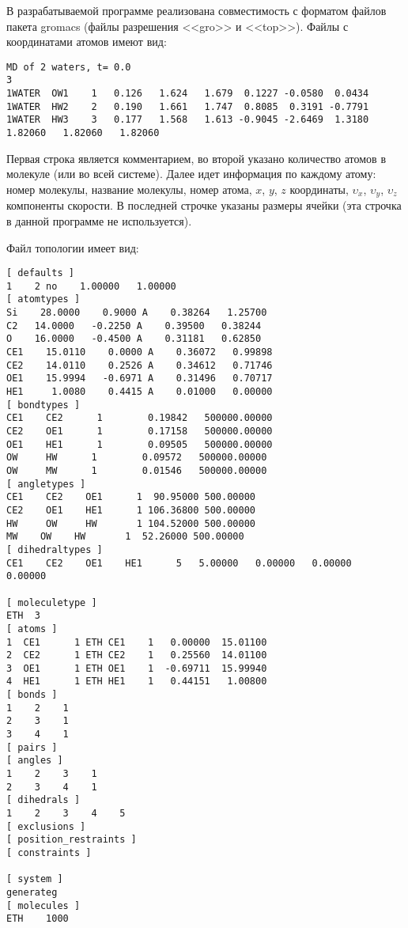 В разрабатываемой программе реализована совместимость с форматом файлов пакета gromacs (файлы разрешения <<gro>> и  <<top>>). Файлы с координатами атомов имеют вид:
\begin{lstlisting}
MD of 2 waters, t= 0.0
3
1WATER  OW1    1   0.126   1.624   1.679  0.1227 -0.0580  0.0434
1WATER  HW2    2   0.190   1.661   1.747  0.8085  0.3191 -0.7791
1WATER  HW3    3   0.177   1.568   1.613 -0.9045 -2.6469  1.3180
1.82060   1.82060   1.82060
\end{lstlisting}

Первая строка является комментарием, во второй указано количество атомов в молекуле (или во всей системе). Далее идет информация по каждому атому: номер молекулы, название молекулы, номер атома, $x$, $y$, $z$ координаты, $\upsilon_x$,  $\upsilon_y$, $\upsilon_z$ компоненты скорости. В последней строчке указаны размеры ячейки (эта строчка в данной программе не используется).

Файл топологии имеет вид:
\begin{lstlisting}
[ defaults ]
1    2 no    1.00000   1.00000
[ atomtypes ]
Si    28.0000    0.9000 A    0.38264   1.25700
C2   14.0000   -0.2250 A    0.39500   0.38244
O    16.0000   -0.4500 A    0.31181   0.62850
CE1    15.0110    0.0000 A    0.36072   0.99898
CE2    14.0110    0.2526 A    0.34612   0.71746
OE1    15.9994   -0.6971 A    0.31496   0.70717
HE1     1.0080    0.4415 A    0.01000   0.00000
[ bondtypes ]
CE1    CE2      1        0.19842   500000.00000
CE2    OE1      1        0.17158   500000.00000
OE1    HE1      1        0.09505   500000.00000
OW     HW      1        0.09572   500000.00000
OW     MW      1        0.01546   500000.00000
[ angletypes ]
CE1    CE2    OE1      1  90.95000 500.00000
CE2    OE1    HE1      1 106.36800 500.00000
HW     OW     HW       1 104.52000 500.00000
MW    OW    HW       1  52.26000 500.00000
[ dihedraltypes ]
CE1    CE2    OE1    HE1      5   5.00000   0.00000   0.00000   0.00000

[ moleculetype ]
ETH  3
[ atoms ]
1  CE1      1 ETH CE1    1   0.00000  15.01100
2  CE2      1 ETH CE2    1   0.25560  14.01100
3  OE1      1 ETH OE1    1  -0.69711  15.99940
4  HE1      1 ETH HE1    1   0.44151   1.00800
[ bonds ]
1    2    1
2    3    1
3    4    1
[ pairs ]
[ angles ]
1    2    3    1
2    3    4    1
[ dihedrals ]
1    2    3    4    5
[ exclusions ]
[ position_restraints ]
[ constraints ]

[ system ]
generateg
[ molecules ]
ETH    1000
\end{lstlisting}

